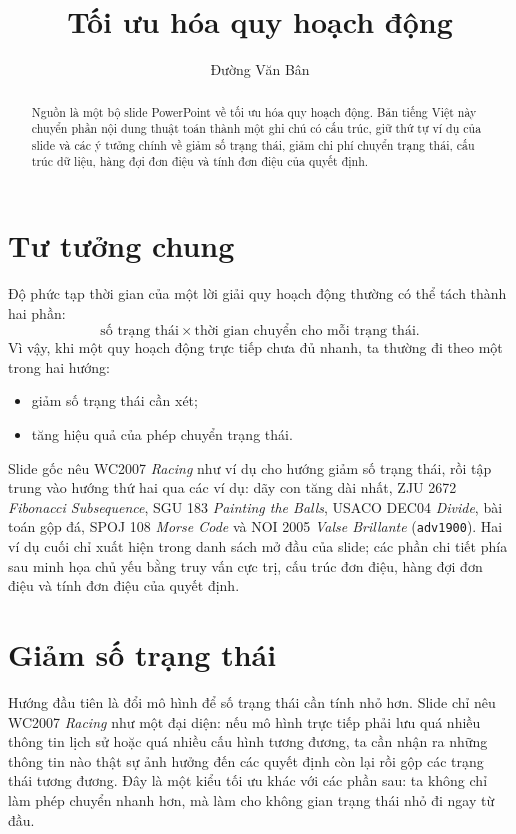\documentclass[11pt]{article}
\title{Tối ưu hóa quy hoạch động}
\author{Đường Văn Bân}
\date{}
\begin{document}
\maketitle


\begin{abstract}
Nguồn là một bộ slide PowerPoint về tối ưu hóa quy hoạch động. Bản tiếng Việt
này chuyển phần nội dung thuật toán thành một ghi chú có cấu trúc, giữ thứ tự
ví dụ của slide và các ý tưởng chính về giảm số trạng thái, giảm chi phí
chuyển trạng thái, cấu trúc dữ liệu, hàng đợi đơn điệu và tính đơn điệu của
quyết định.
\end{abstract}

\section*{Tư tưởng chung}

Độ phức tạp thời gian của một lời giải quy hoạch động thường có thể tách
thành hai phần:
\[
  \text{số trạng thái}\times\text{thời gian chuyển cho mỗi trạng thái}.
\]
Vì vậy, khi một quy hoạch động trực tiếp chưa đủ nhanh, ta thường đi theo một
trong hai hướng:
\begin{itemize}
  \item giảm số trạng thái cần xét;
  \item tăng hiệu quả của phép chuyển trạng thái.
\end{itemize}
Slide gốc nêu WC2007 \emph{Racing} như ví dụ cho hướng giảm số trạng thái,
rồi tập trung vào hướng thứ hai qua các ví dụ: dãy con tăng dài nhất, ZJU 2672
\emph{Fibonacci Subsequence}, SGU 183 \emph{Painting the Balls}, USACO DEC04
\emph{Divide}, bài toán gộp đá, SPOJ 108 \emph{Morse Code} và NOI 2005
\emph{Valse Brillante} (\texttt{adv1900}). Hai ví dụ cuối chỉ xuất hiện trong
danh sách mở đầu của slide; các phần chi tiết phía sau minh họa chủ yếu bằng
truy vấn cực trị, cấu trúc đơn điệu, hàng đợi đơn điệu và tính đơn điệu của
quyết định.

\section{Giảm số trạng thái}

Hướng đầu tiên là đổi mô hình để số trạng thái cần tính nhỏ hơn. Slide chỉ nêu
WC2007 \emph{Racing} như một đại diện: nếu mô hình trực tiếp phải lưu quá
nhiều thông tin lịch sử hoặc quá nhiều cấu hình tương đương, ta cần nhận ra
những thông tin nào thật sự ảnh hưởng đến các quyết định còn lại rồi gộp các
trạng thái tương đương. Đây là một kiểu tối ưu khác với các phần sau: ta không
chỉ làm phép chuyển nhanh hơn, mà làm cho không gian trạng thái nhỏ đi ngay từ
đầu.
\end{document}
